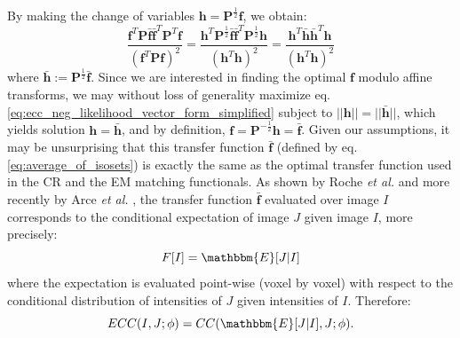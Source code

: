 By making the change of variables $\mathbf{h} = \mathbf{P}^{\frac{1}{2}}\mathbf{f}$, we obtain:
\begin{equation}\label{eq:ecc_neg_likelihood_vector_form_simplified}
    \frac{\mathbf{f}^{T}\mathbf{P}\mathbf{\bar{f}}\mathbf{\bar{f}}^{T}\mathbf{P}^{T}\mathbf{f}}{\left(\mathbf{f}^{T} \mathbf{P} \mathbf{f}\right)^{2}} =
    \frac{\mathbf{h}^{T}\mathbf{P}^{\frac{1}{2}}\mathbf{\bar{f}}\mathbf{\bar{f}}^{T}\mathbf{P}^{\frac{1}{2}}\mathbf{h}} {\left(\mathbf{h}^{T}\mathbf{h}\right)^{2}} =
    \frac{\mathbf{h}^{T}\mathbf{\bar{h}}\mathbf{\bar{h}}^{T}\mathbf{h}} {\left(\mathbf{h}^{T}\mathbf{h}\right)^{2}}
\end{equation}
where $\mathbf{\bar{h}} := \mathbf{P}^{\frac{1}{2}}\mathbf{\bar{f}}$. Since we are interested in finding the optimal $\mathbf{f}$ modulo affine transforms, we may without loss of generality maximize eq. \eqref{eq:ecc_neg_likelihood_vector_form_simplified} subject to $||\mathbf{h}|| = ||\mathbf{\bar{h}}||$, which yields solution $\mathbf{h} = \mathbf{\bar{h}}$, and by definition, $\mathbf{f} = \mathbf{P}^{-\frac{1}{2}}\mathbf{h} = \mathbf{\bar{f}}$. Given our assumptions, it may be unsurprising that this transfer function $\mathbf{\bar{f}}$ (defined by eq. \eqref{eq:average_of_isosets}) is exactly the same as the optimal transfer function used in the CR and the EM matching functionals. As shown by Roche {\it et al.} \citep{Roche1998, Roche2000} and more recently by Arce {\it et al.} \cite{Arce-santana2014}, the transfer function $\mathbf{\bar{f}}$ evaluated over image $I$ corresponds to the conditional expectation of image $J$ given image $I$, more precisely:
\begin{equation*}
    F[I] = \mathbbm{E}[J | I]
\end{equation*}
where the expectation is evaluated point-wise (voxel by voxel) with respect to the conditional distribution of intensities of $J$ given intensities of $I$. Therefore:
\begin{equation}\label{eq:ecc_meaning}
    ECC(I, J; \phi) = CC(\mathbbm{E}[J|I], J ; \phi).
\end{equation}
